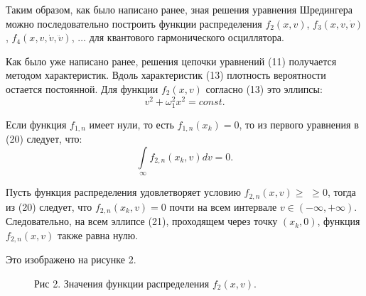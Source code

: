 \documentclass[a4paper,14pt]{article}
\begin{document}
Таким образом, как было написано ранее, зная решения уравнения Шредингера можно последовательно построить функции распределения $f_2(x, v)$, $ f_3(x, v, \dot v)$, $f_4(x, v, \dot v, \ddot v)$, $\ldots$ для квантового гармонического осциллятора. 

Как было уже написано ранее, решения цепочки уравнений (11) получается методом характеристик. Вдоль характеристик (13) плотность вероятности остается постоянной. Для функции $f_2(x, v)$ согласно (13) это эллипсы:
\begin{equation}
v^{2}+\omega_{1}^{2} x^{2}=const.
\end{equation}

Если функция $f_{1,n}$ имеет нули, то есть $f_{1,n}(x_k)=0$, то из первого уравнения в (20) следует, что:
\begin{equation}
\int\limits_{\infty} f_{2, n}\left(x_{k}, v\right) d v=0.
\end{equation}

Пусть функция распределения удовлетворяет условию $f_{2, n}(x, v) \geq $ $\geq 0$, тогда из (20) следует, что $f_{2, n}\left(x_{k}, v\right)=0$ почти на всем интервале $v \in(-\infty,+\infty)$. Следовательно, на всем эллипсе (21), проходящем через точку $\left(x_{k}, 0\right)$, функция $f_{2,n}(x, v)$ также равна нулю.

Это изображено на рисунке 2.
\begin{figure}[H]
	\caption*{Рис 2. Значения функции распределения $f_2(x,v).$}
	\label{fig:image}
\end{figure}
\end{document}
